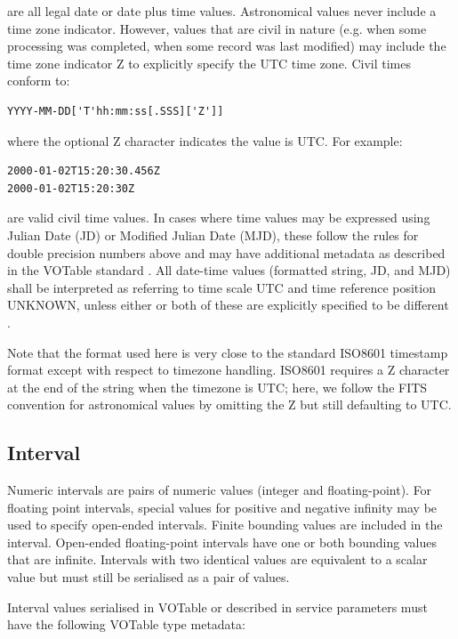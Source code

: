 \documentclass[11pt,letter]{ivoa}
\begin{document}
\noindent
are all legal date or date plus time values. Astronomical values never
include a time zone indicator. However, values that
are civil in nature (e.g. when some processing was completed, when some record
was last modified) may include the time zone indicator Z to explicitly specify
the UTC time zone. Civil times conform to:

\begin{verbatim}
YYYY-MM-DD['T'hh:mm:ss[.SSS]['Z']]
\end{verbatim}

\noindent
where the optional Z character indicates the value is UTC. For example:

\begin{verbatim}
2000-01-02T15:20:30.456Z
2000-01-02T15:20:30Z
\end{verbatim}

\noindent
are valid civil time values. In cases where time values may be
expressed using Julian Date (JD) or Modified Julian Date (MJD), these follow the
rules for double precision numbers above and may have additional metadata as
described in the VOTable standard \citep{2019ivoa.spec.1021O}. All date-time values (formatted string, JD,
and MJD) shall be interpreted as referring to time scale UTC and time reference
position UNKNOWN, unless either or both of these are explicitly specified to be
different \citep{2007ivoa.spec.1030R}.

Note that the format used here is very close to the standard ISO8601 timestamp
format except with respect to timezone handling. ISO8601 requires a Z character
at the end of the string when the timezone is UTC; here, we follow the FITS
\citep{std:FITS} convention for astronomical values by omitting the Z but still
defaulting to UTC.

\subsection{Interval}
Numeric intervals are pairs of numeric values (integer and floating-point). For floating point
intervals, special values for positive and negative infinity may be used to specify open-ended intervals.
Finite bounding values are included in the interval. Open-ended floating-point
intervals have one or both bounding values that are infinite. Intervals with two identical values
are equivalent to a scalar value but must still be serialised as a pair of values.

Interval values serialised in VOTable or described in service parameters must have
the following VOTable type metadata:
\end{document}
